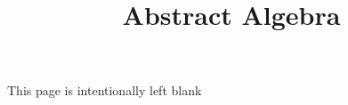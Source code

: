 \documentclass[a4paper]{article}
\title{Abstract Algebra}
\begin{document}
    \maketitle
    \tableofcontents
    \newpage
    This page is intentionally left blank
    \newpage
    
    
    
    
    
    
    
    
    
    
    
    
    
    
    
    
    
    
    
    
    
    
    
    
    
    
    
    
    
    
    
    
    
    
    
    
    
    
    
    
    
    
    \printbibliography
\end{document}
